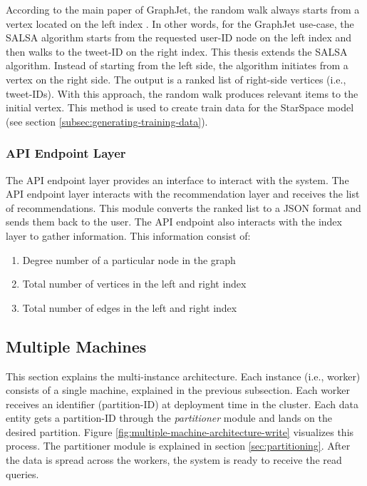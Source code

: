 According to the main paper of GraphJet, the random walk always starts from a vertex located on the left index \cite{sharmaGraphJetRealtimeContent2016}. In other words, for the GraphJet use-case, the SALSA algorithm starts from the requested user-ID node on the left index and then walks to the tweet-ID on the right index. This thesis extends the SALSA algorithm. Instead of starting from the left side, the algorithm initiates from a vertex on the right side. The output is a ranked list of right-side vertices (i.e., tweet-IDs). With this approach, the random walk produces relevant items to the initial vertex. This method is used to create train data for the StarSpace model (see section \ref{subsec:generating-training-data}).

\subsubsection{API Endpoint Layer}
\label{subsubsec:api-endpoint-layer}
The API endpoint layer provides an interface to interact with the system. The API endpoint layer interacts with the recommendation layer and receives the list of recommendations. This module converts the ranked list to a JSON format and sends them back to the user.
The API endpoint also interacts with the index layer to gather information. This information consist of:

\begin{enumerate}
    \item Degree number of a particular node in the graph
    \item Total number of vertices in the left and right index
    \item Total number of edges in the left and right index
\end{enumerate}

\subsection{Multiple Machines}
\label{subsec:multiple-machines}
This section explains the multi-instance architecture. Each instance (i.e., worker) consists of a single machine, explained in the previous subsection. Each worker receives an identifier (partition-ID) at deployment time in the cluster. Each data entity gets a partition-ID through the \emph{partitioner} module and lands on the desired partition. Figure \ref{fig:multiple-machine-architecture-write} visualizes this process. The partitioner module is explained in section \ref{sec:partitioning}. After the data is spread across the workers, the system is ready to receive the read queries. 


